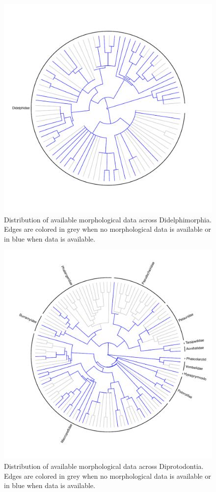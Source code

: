 \documentclass[12pt,letterpaper]{article}
\begin{document}
\begin{figure}[!htbp]
\centering
    \includegraphics[width=1\textwidth]{Supp_figure_DIDELPHIMORPHIA.pdf}
\caption{Distribution of available morphological data across Didelphimorphia. Edges are colored in grey when no morphological data is available or in blue when data is available.}
\label{Supp_Figure_Phylo-Didelphimorphia}
\end{figure}

\begin{figure}[!htbp]
\centering
    \includegraphics[width=1\textwidth]{Supp_figure_DIPROTODONTIA.pdf}
\caption{Distribution of available morphological data across Diprotodontia. Edges are colored in grey when no morphological data is available or in blue when data is available.}
\label{Supp_Figure_Phylo-Diprotodontia}
\end{figure}
\end{document}
